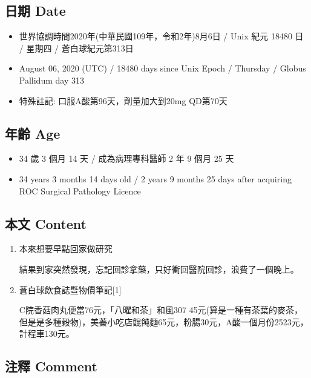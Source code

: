 \documentclass[a5paper, 11pt
]{book}
\providecommand{\tightlist}{%
  \setlength{\itemsep}{0pt}\setlength{\parskip}{0pt}}
\begin{document}
\hypertarget{ux65e5ux671f-date-57}{%
\subsection{日期 Date}\label{ux65e5ux671f-date-57}}

\begin{itemize}
\tightlist
\item
  世界協調時間2020年(中華民國109年，令和2年)8月6日 / Unix 紀元 18480 日
  / 星期四 / 蒼白球紀元第313日
\item
  August 06, 2020 (UTC) / 18480 days since Unix Epoch / Thursday /
  Globus Pallidum day 313
\item
  特殊註記: 口服A酸第96天，劑量加大到20mg QD第70天
\end{itemize}

\hypertarget{ux5e74ux9f61-age-57}{%
\subsection{年齡 Age}\label{ux5e74ux9f61-age-57}}

\begin{itemize}
\tightlist
\item
  34 歲 3 個月 14 天 / 成為病理專科醫師 2 年 9 個月 25 天
\item
  34 years 3 months 14 days old / 2 years 9 months 25 days after
  acquiring ROC Surgical Pathology Licence
\end{itemize}

\hypertarget{ux672cux6587-content-57}{%
\subsection{本文 Content}\label{ux672cux6587-content-57}}

\begin{enumerate}
\def\labelenumi{\arabic{enumi}.}
\item
  本來想要早點回家做研究

  結果到家突然發現，忘記回診拿藥，只好衝回醫院回診，浪費了一個晚上。
\item
  蒼白球飲食誌暨物價筆記{[}1{]}

  C院香菇肉丸便當76元，「八曜和茶」和風307
  45元(算是一種有茶葉的麥茶，但是是多種穀物)，美蓁小吃店餛飩麵65元，粉腸30元，A酸一個月份2523元，計程車130元。
\end{enumerate}

\hypertarget{ux6ce8ux91cb-comment-57}{%
\subsection{注釋 Comment}\label{ux6ce8ux91cb-comment-57}}
\end{document}

